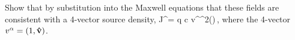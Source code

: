 \newcommand{\Ja}{J^\alp}
\newcommand{\Jb}{J^\bet}
\newcommand{\dela}{\partial_\alp}
\newcommand{\valp}{v^\alp}
\newcommand{\delrp}{\del^2(\vrperp)}

\begin{problem}
	Show that by substitution into the Maxwell equations that these fields are consistent with a 4-vector source density,
	\beq
		\Ja = q c \valp \delrp \,\delctz,
	\eeq
	where the 4-vector $\valp = (1, \vh)$.
\end{problem}

\newcommand{\cV}{\mathcal{V}}
\newcommand{\dcV}{\partial \cV}
\newcommand{\dS}{\partial S}
\newcommand{\nh}{\vb{\hat{n}}}
\newcommand{\vro}{\vr_0}
\newcommand{\grperp}{\grad_{\!\perp}}

\newcommand{\dtht}{\dd{\tht}}
\newcommand{\ddcV}{\dd{(\dcV)}}
\newcommand{\ddS}{\dd{(\dS)}}
\newcommand{\intotp}{\int_0^{2\pi}}
\newcommand{\intS}{\int_S}
\newcommand{\intdS}{\int_{\dS}}
\newcommand{\intcV}{\int_\cV}
\newcommand{\intdcV}{\int_{\dcV}}
\newcommand{\dcr}{\dd[3]{r}}
\newcommand{\dsr}{\dd[2]{r}}

\newcommand{\Jo}{J^0}
\newcommand{\vJ}{\vb{J}}
\newcommand{\vaa}{\vb{a}}
\newcommand{\rperpx}{{\rperp}_x}
\newcommand{\rperpy}{{\rperp}_y}


